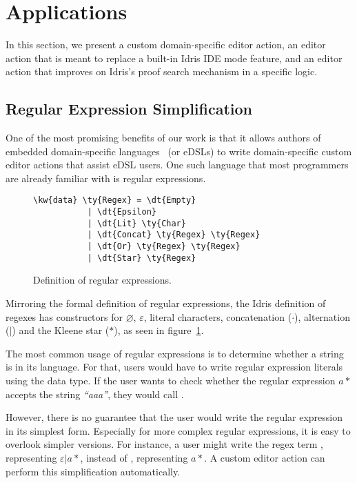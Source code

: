 \section{Applications} \label{sec:applications}

In this section, we present a custom domain-specific editor action, an editor
action that is meant to replace a built-in Idris IDE mode feature, and an
editor action that improves on Idris's proof search mechanism in a specific
logic.

\subsection{Regular Expression Simplification}

One of the most promising benefits of our work is that it allows authors of
embedded domain-specific languages~\cite{dsel} (or eDSLs) to write domain-specific
custom editor actions that assist eDSL users.
One such language that most programmers are already familiar with is regular
expressions.

\begin{figure}[ht]
\begin{Verbatim}
\kw{data} \ty{Regex} = \dt{Empty}
           | \dt{Epsilon}
           | \dt{Lit} \ty{Char}
           | \dt{Concat} \ty{Regex} \ty{Regex}
           | \dt{Or} \ty{Regex} \ty{Regex}
           | \dt{Star} \ty{Regex}
\end{Verbatim}
\caption{Definition of regular expressions.}
\label{code:regex}
\end{figure}

Mirroring the formal definition of regular expressions, the Idris definition of
regexes has constructors for $\varnothing$, $\varepsilon$, literal
characters, concatenation ($\cdot$), alternation ($|$) and the Kleene star ($*$),
as seen in figure~\ref{code:regex}.

The most common usage of regular expressions is to determine whether a string is in its language.
For that, users would have to write regular expression literals using the
 data type. If the user wants to check whether the regular expression
$a*$ accepts the string \textit{``aaa''}, they would call
.

However, there is no guarantee that the user would write the regular expression
in its simplest form. Especially for more complex regular expressions, it is
easy to overlook simpler versions. For instance, a user might write the regex
term , representing
$\varepsilon | a*$, instead of , representing $a*$.
A custom editor action can perform this simplification automatically.

